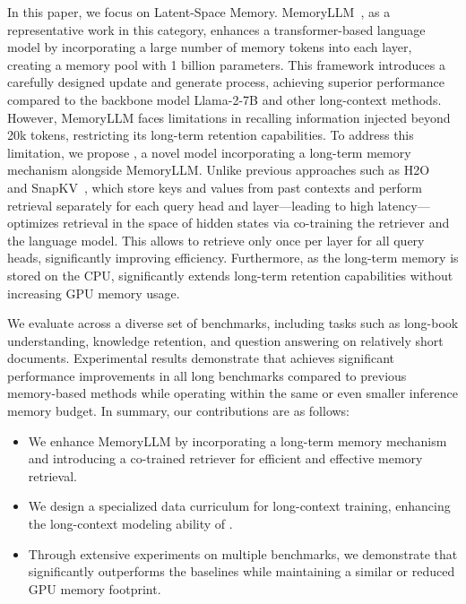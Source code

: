 \vspace{-3pt}

In this paper, we focus on Latent-Space Memory. MemoryLLM~\citep{memoryllm}, as a representative work in this category,
enhances a transformer-based language model by incorporating a large number of memory tokens into each layer, creating a memory pool with 1 billion parameters. This framework introduces a carefully designed update and generate process, achieving superior performance compared to the backbone model Llama-2-7B and other long-context methods. However, MemoryLLM faces limitations in recalling information injected beyond 20k tokens, restricting its long-term retention capabilities.
To address this limitation, we propose \textbf{\ours}, a novel model incorporating a long-term memory mechanism alongside MemoryLLM.
Unlike previous approaches such as H2O~\citep{h2o} and SnapKV~\citep{snapkv}, which store keys and values from past contexts and perform retrieval separately for each query head and layer—leading to high latency—\ours optimizes retrieval in the space of hidden states via co-training the retriever and the language model.  This allows \ours to retrieve only once per layer for all query heads, significantly improving efficiency. 
Furthermore, as the long-term memory is stored on the CPU, \ours significantly extends long-term retention capabilities without increasing GPU memory usage. 


We evaluate \ours across a diverse set of benchmarks, including tasks such as long-book understanding, knowledge retention, and question answering on relatively short documents. Experimental results demonstrate that \ours achieves significant performance improvements in all long benchmarks compared to previous memory-based methods while operating within the same or even smaller inference memory budget. In summary, our contributions are as follows:
\vspace{-5pt}

\begin{itemize}
\item We enhance MemoryLLM by incorporating a long-term memory mechanism and introducing a co-trained retriever for efficient and effective memory retrieval.
\vspace{-5pt}
\item We design a specialized data curriculum for long-context training, enhancing the long-context modeling ability of \ours. 
\vspace{-5pt}
\item Through extensive experiments on multiple benchmarks, we demonstrate that \ours significantly outperforms the baselines while maintaining a similar or reduced GPU memory footprint.
\end{itemize}